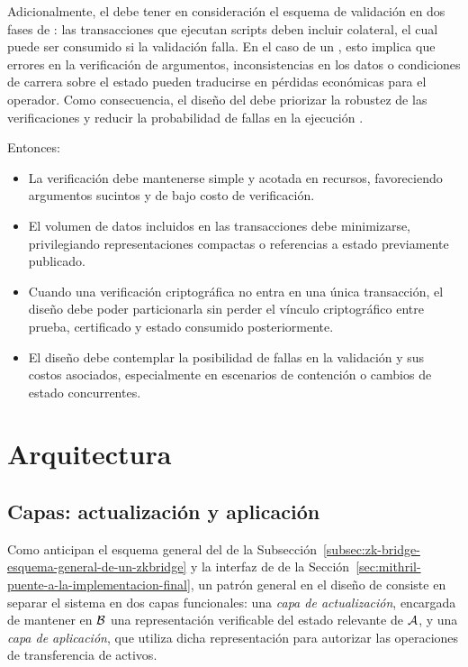 Adicionalmente, el \Bridge debe tener en consideración el esquema de validación en dos fases de \Cardano: las transacciones que ejecutan scripts deben incluir colateral, el cual puede ser consumido si la validación falla. En el caso de un \zkBridge, esto implica que errores en la verificación de argumentos, inconsistencias en los datos o condiciones de carrera sobre el estado \Onchain pueden traducirse en pérdidas económicas para el operador. Como consecuencia, el diseño del \Bridge debe priorizar la robustez de las verificaciones y reducir la probabilidad de fallas en la ejecución \Onchain.

Entonces:

\begin{itemize}[noitemsep]
	\item La verificación \Onchain debe mantenerse simple y acotada en recursos, favoreciendo argumentos sucintos y de bajo costo de verificación.
	\item El volumen de datos incluidos en las transacciones debe minimizarse, privilegiando representaciones compactas o referencias a estado previamente publicado.
	\item Cuando una verificación criptográfica no entra en una única transacción, el diseño debe poder particionarla sin perder el vínculo criptográfico entre prueba, certificado y estado consumido posteriormente.
	\item El diseño debe contemplar la posibilidad de fallas en la validación y sus costos asociados, especialmente en escenarios de contención o cambios de estado concurrentes.
\end{itemize}

\section{Arquitectura}
\label{sec:design-decisions-arquitectura}

\subsection{Capas: actualización y aplicación}
\label{subsec:design-decisions-capas-actualizacion-y-aplicacion}

Como anticipan el esquema general del \zkBridge de la Subsección~\ref{subsec:zk-bridge-esquema-general-de-un-zkbridge} y la interfaz de \Mithril de la Sección~\ref{sec:mithril-puente-a-la-implementacion-final}, un patrón general en el diseño de \Bridges consiste en separar el sistema en dos capas funcionales: una \emph{capa de actualización}, encargada de mantener en $\mathcal{B}$ una representación verificable del estado relevante de $\mathcal{A}$, y una \emph{capa de aplicación}, que utiliza dicha representación para autorizar las operaciones de transferencia de activos.

